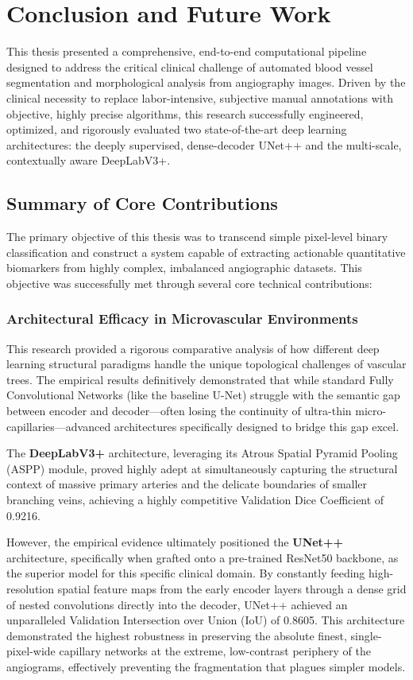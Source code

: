 \chapter{Conclusion and Future Work}
\label{ch:conclusion}

This thesis presented a comprehensive, end-to-end computational pipeline designed to address the critical clinical challenge of automated blood vessel segmentation and morphological analysis from angiography images. Driven by the clinical necessity to replace labor-intensive, subjective manual annotations with objective, highly precise algorithms, this research successfully engineered, optimized, and rigorously evaluated two state-of-the-art deep learning architectures: the deeply supervised, dense-decoder UNet++ and the multi-scale, contextually aware DeepLabV3+. 

\section{Summary of Core Contributions}
The primary objective of this thesis was to transcend simple pixel-level binary classification and construct a system capable of extracting actionable quantitative biomarkers from highly complex, imbalanced angiographic datasets. This objective was successfully met through several core technical contributions:

\subsection{Architectural Efficacy in Microvascular Environments}
This research provided a rigorous comparative analysis of how different deep learning structural paradigms handle the unique topological challenges of vascular trees. The empirical results definitively demonstrated that while standard Fully Convolutional Networks (like the baseline U-Net) struggle with the semantic gap between encoder and decoder---often losing the continuity of ultra-thin micro-capillaries---advanced architectures specifically designed to bridge this gap excel. 

The \textbf{DeepLabV3+} architecture, leveraging its Atrous Spatial Pyramid Pooling (ASPP) module, proved highly adept at simultaneously capturing the structural context of massive primary arteries and the delicate boundaries of smaller branching veins, achieving a highly competitive Validation Dice Coefficient of 0.9216. 

However, the empirical evidence ultimately positioned the \textbf{UNet++} architecture, specifically when grafted onto a pre-trained ResNet50 backbone, as the superior model for this specific clinical domain. By constantly feeding high-resolution spatial feature maps from the early encoder layers through a dense grid of nested convolutions directly into the decoder, UNet++ achieved an unparalleled Validation Intersection over Union (IoU) of 0.8605. This architecture demonstrated the highest robustness in preserving the absolute finest, single-pixel-wide capillary networks at the extreme, low-contrast periphery of the angiograms, effectively preventing the fragmentation that plagues simpler models.

